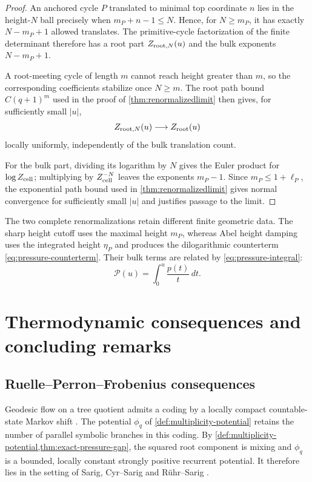 \documentclass[11pt,reqno]{amsart}
\numberwithin{equation}{section}
\theoremstyle{definition}
\theoremstyle{remark}
\begin{document}
\begin{proof}
An anchored cycle $P$ translated to minimal top coordinate $n$ lies in the
height-$N$ ball precisely when $m_P+n-1\le N$.  Hence, for $N\ge m_P$, it has
exactly $N-m_P+1$ allowed translates.  The primitive-cycle factorization of
the finite determinant therefore has a root part $Z_{{\rm root},N}(u)$ and the
bulk exponents $N-m_P+1$.

A root-meeting cycle of length $m$ cannot reach height greater than $m$, so
the corresponding coefficients stabilize once $N\ge m$.  The root path bound
$C(q+1)^m$ used in the proof of \cref{thm:renormalizedlimit} then gives,
for sufficiently small $|u|$,
\[
 Z_{{\rm root},N}(u)\longrightarrow Z_{\rm root}(u)
\]
locally uniformly, independently of the bulk translation count.

For the bulk part, dividing its logarithm by $N$ gives the Euler product for
$\log Z_{\rm cell}$; multiplying by $Z_{\rm cell}^{-N}$ leaves the exponents
$m_P-1$.  Since $m_P\le1+\ell_P$, the exponential path bound used in
\cref{thm:renormalizedlimit} gives normal convergence for sufficiently small
$|u|$ and justifies passage to the limit.
\end{proof}

The two complete renormalizations retain different finite geometric data.
The sharp height cutoff uses the maximal height $m_P$, whereas Abel height
damping uses the integrated height $\eta_P$ and produces the dilogarithmic
counterterm \eqref{eq:pressure-counterterm}.  Their bulk terms are related by
\eqref{eq:pressure-integral}:
\[
 \mathscr P(u)=\int_0^u\frac{p(t)}t\,dt.
\]

\section{Thermodynamic consequences and concluding remarks}
\label{sec:thermo}

\subsection{Ruelle--Perron--Frobenius consequences}

Geodesic flow on a tree quotient admits a coding by a locally compact
countable-state Markov shift
\cite{BroisePaulinCoding2007,BroisePaulinModular2007,
BroiseParkkonenPaulin2019,BroiseParkkonenPaulin2021}.
The potential $\phi_q$ of \cref{def:multiplicity-potential} retains the number
of parallel symbolic branches in this coding.  By
\cref{def:multiplicity-potential,thm:exact-pressure-gap}, the squared root
component is mixing and $\phi_q$ is a bounded, locally constant strongly
positive recurrent potential.  It therefore lies in the setting of Sarig,
Cyr--Sarig and R\"uhr--Sarig
\cite{Sarig1999,Sarig2003,SarigPhase2001,CyrSarig2009,RuhrSarig2022}.
\end{document}
